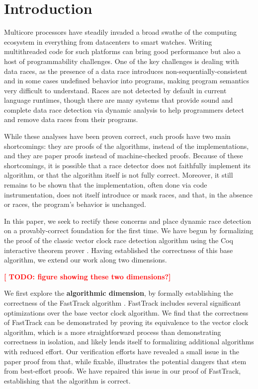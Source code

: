 \documentclass[preprint, 10pt]{sigplanconf}
\newcommand{\TODO}[1]{\textbf{\textcolor{red}{[ TODO: #1]}}}
\begin{document}
\section{Introduction}

Multicore processors have steadily invaded a broad swathe of the computing ecosystem in everything from datacenters to smart watches. Writing multithreaded code for such platforms can bring good performance but also a host of programmability challenges. One of the key challenges is dealing with data races, as the presence of a data race introduces non-sequentially-consistent \cite{manson_java_2005} and in some cases undefined \cite{boehm_foundations_2008} behavior into programs, making program semantics very difficult to understand. Races are not detected by default in current language runtimes, though there are many systems that provide sound and complete data race detection via dynamic analysis \cite{djit+,fasttrack,slimstate,slimfast} to help programmers detect and remove data races from their programs. 

While these analyses have been proven correct, such proofs have two main shortcomings: they are proofs of the algorithms, instead of the implementations, and they are paper proofs instead of machine-checked proofs. Because of these shortcomings, it is possible that a race detector does not faithfully implement its algorithm, or that the algorithm itself is not fully correct. Moreover, it still remains to be shown that the implementation, often done via code instrumentation, does not itself introduce or mask races, and that, in the absence or races, the program's behavior is unchanged.

In this paper, we seek to rectify these concerns and place dynamic race detection on a provably-correct foundation for the first time. We have begun by formalizing the proof of the classic vector clock race detection algorithm \cite{fidge,friedmann_mattern} using the Coq interactive theorem prover \cite{coq}. Having established the correctness of this base algorithm, we extend our work along two dimensions. 

\TODO{figure showing these two dimensions?}

We first explore the \textbf{algorithmic dimension}, by formally establishing the correctness of the FastTrack algorithm \cite{fasttrack}. FastTrack includes several significant optimizations over the base vector clock algorithm. We find that the correctness of FastTrack can be demonstrated by proving its equivalence to the vector clock algorithm, which is a more straightforward process than demonstrating correctness in isolation, and likely lends itself to formalizing additional algorithms with reduced effort. Our verification efforts have revealed a small issue in the paper proof from \cite{fasttrack} that, while fixable, illustrates the potential dangers that stem from best-effort proofs. We have repaired this issue in our proof of FastTrack, establishing that the algorithm is correct.
\end{document}

